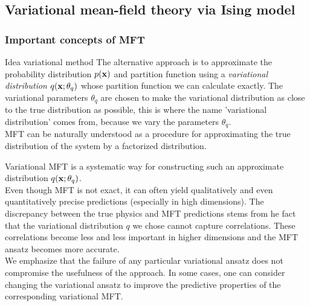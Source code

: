 \subsection{Variational mean-field theory via Ising model}

\subsubsection{Important concepts of MFT}
\label{subsubsec:varMFTconcepts}
\begin{mybox}{Idea variational method}
The alternative approach is to approximate the probability distribution $p(\mathbf{x})$ and partition function using a \emph{variational distribution} $q(\mathbf{x};\theta_q)$ whose partition function we can calculate exactly. The variational parameters $\theta_q$ are chosen to make the variational distribution as close to the true distribution as possible, this is where the name ’variational distribution’ comes from, because we vary the parameters $\theta_q$.\\
MFT can be naturally understood as a procedure for approximating the true distribution of the system by a factorized distribution.
\end{mybox}
Variational MFT is a systematic way for constructing such an approximate distribution $q(\mathbf{x};\theta_q)$.\\
Even though MFT is not exact, it can often yield qualitatively and even quantitatively precise predictions (especially in high dimensions). The discrepancy between the true physics and MFT predictions stems from he fact that the variational distribution $q$ we chose cannot capture correlations. These correlations become less and less important in higher dimensions and the MFT ansatz becomes more accurate.\\
We emphasize that the failure of any particular variational ansatz does not compromise the usefulness of the approach. In some cases, one can consider changing the variational ansatz to improve the predictive properties of the corresponding variational MFT.
